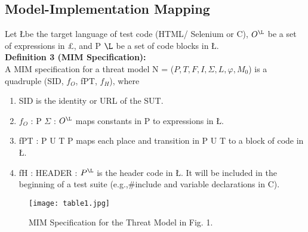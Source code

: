 \subsection{\large Model-Implementation Mapping}
Let \L be the target language of test code (HTML/
Selenium or C), $O^{\L}$ be a set of expressions in £, and P $\L$ be a set of code blocks in \L.
\\
\textbf{Definition 3 (MIM Specification):} 
\\ A MIM specification for a
threat model N = ($P,T,F,I,\Sigma,L,\varphi,M_0$) is a quadruple
(SID, $f_O$, fPT, $f_H$), where
\begin{enumerate}
\item SID is the identity or URL of the SUT.
\item $f_O$ : P $\Sigma$ : $O^{\L}$ maps constants in P to expressions
in \L.
\item fPT : P U T P maps each place and transition in
P U T to a block of code in \L.
\item  fH : HEADER : $P^{\L}$ is the header code in \L. It
will be included in the beginning of a test suite (e.g.,\#include and variable declarations in C).
\end{enumerate}
\begin{figure}
\centering
\texttt{[image: table1.jpg]}
\caption{MIM Specification for the Threat Model in Fig. 1.}
\label{fig:TABLE1}
\end{figure}
